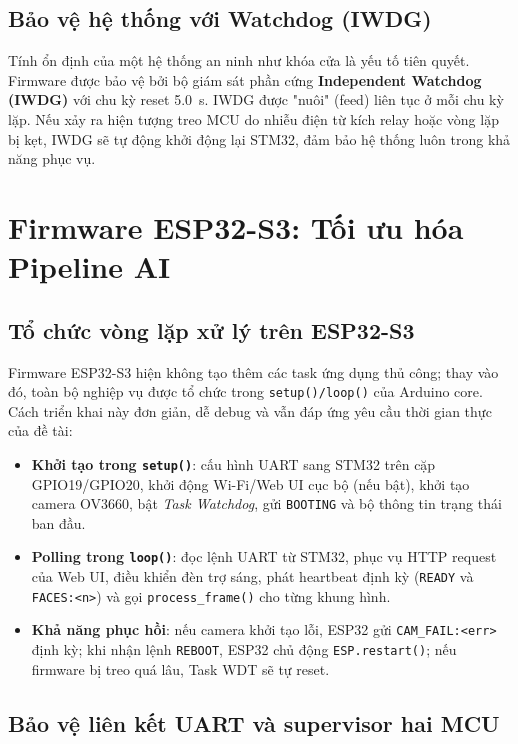 \subsection{Bảo vệ hệ thống với Watchdog (IWDG)}

Tính ổn định của một hệ thống an ninh như khóa cửa là yếu tố tiên quyết. Firmware được bảo vệ bởi bộ giám sát phần cứng \textbf{Independent Watchdog (IWDG)} với chu kỳ reset \SI{5.0}{s}. IWDG được "nuôi" (feed) liên tục ở mỗi chu kỳ lặp. Nếu xảy ra hiện tượng treo MCU do nhiễu điện từ kích relay hoặc vòng lặp bị kẹt, IWDG sẽ tự động khởi động lại STM32, đảm bảo hệ thống luôn trong khả năng phục vụ.

\section{Firmware ESP32-S3: Tối ưu hóa Pipeline AI}
\label{sec:esp32_fw}

\subsection{Tổ chức vòng lặp xử lý trên ESP32-S3}

Firmware ESP32-S3 hiện không tạo thêm các task ứng dụng thủ công; thay vào đó, toàn bộ nghiệp vụ được tổ chức trong \texttt{setup()/loop()} của Arduino core. Cách triển khai này đơn giản, dễ debug và vẫn đáp ứng yêu cầu thời gian thực của đề tài:

\begin{itemize}
  \item \textbf{Khởi tạo trong \texttt{setup()}}: cấu hình UART sang STM32 trên cặp GPIO19/GPIO20, khởi động Wi-Fi/Web UI cục bộ (nếu bật), khởi tạo camera OV3660, bật \textit{Task Watchdog}, gửi \texttt{BOOTING} và bộ thông tin trạng thái ban đầu.
  \item \textbf{Polling trong \texttt{loop()}}: đọc lệnh UART từ STM32, phục vụ HTTP request của Web UI, điều khiển đèn trợ sáng, phát heartbeat định kỳ (\texttt{READY} và \texttt{FACES:<n>}) và gọi \texttt{process\_frame()} cho từng khung hình.
  \item \textbf{Khả năng phục hồi}: nếu camera khởi tạo lỗi, ESP32 gửi \texttt{CAM\_FAIL:<err>} định kỳ; khi nhận lệnh \texttt{REBOOT}, ESP32 chủ động \texttt{ESP.restart()}; nếu firmware bị treo quá lâu, Task WDT sẽ tự reset.
\end{itemize}

\subsection{Bảo vệ liên kết UART và supervisor hai MCU}

